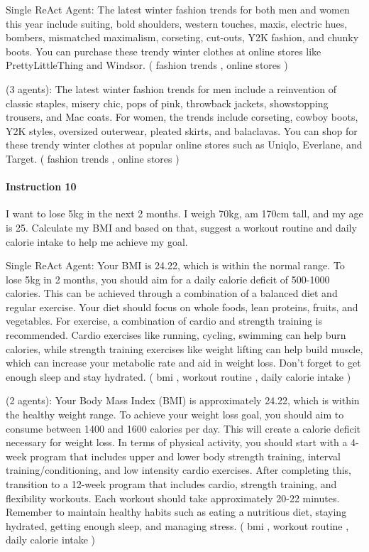 {\color{blue} Single ReAct Agent}: The latest winter fashion trends for both men and women this year include suiting, bold shoulders, western touches, maxis, electric hues, bombers, mismatched maximalism, corseting, cut-outs, Y2K fashion, and chunky boots. You can purchase these trendy winter clothes at online stores like PrettyLittleThing and Windsor. ({\color{teal} fashion trends \cmark}, {\color{teal} online stores \cmark})

{\color{magenta} \framework (3 agents)}: The latest winter fashion trends for men include a reinvention of classic staples, misery chic, pops of pink, throwback jackets, showstopping trousers, and Mac coats. For women, the trends include corseting, cowboy boots, Y2K styles, oversized outerwear, pleated skirts, and balaclavas. You can shop for these trendy winter clothes at popular online stores such as Uniqlo, Everlane, and Target. ({\color{teal} fashion trends \cmark}, {\color{teal} online stores \cmark})

\paragraph{Instruction 10} I want to lose 5kg in the next 2 months. I weigh 70kg, am 170cm tall, and my age is 25. Calculate my BMI and based on that, suggest a workout routine and daily calorie intake to help me achieve my goal.

{\color{blue} Single ReAct Agent}: Your BMI is 24.22, which is within the normal range. To lose 5kg in 2 months, you should aim for a daily calorie deficit of 500-1000 calories. This can be achieved through a combination of a balanced diet and regular exercise. Your diet should focus on whole foods, lean proteins, fruits, and vegetables. For exercise, a combination of cardio and strength training is recommended. Cardio exercises like running, cycling, swimming can help burn calories, while strength training exercises like weight lifting can help build muscle, which can increase your metabolic rate and aid in weight loss. Don't forget to get enough sleep and stay hydrated. ({\color{teal} bmi \cmark}, {\color{teal} workout routine \cmark}, {\color{teal} daily calorie intake \cmark})

{\color{magenta} \framework (2 agents)}: Your Body Mass Index (BMI) is approximately 24.22, which is within the healthy weight range. To achieve your weight loss goal, you should aim to consume between 1400 and 1600 calories per day. This will create a calorie deficit necessary for weight loss. In terms of physical activity, you should start with a 4-week program that includes upper and lower body strength training, interval training/conditioning, and low intensity cardio exercises. After completing this, transition to a 12-week program that includes cardio, strength training, and flexibility workouts. Each workout should take approximately 20-22 minutes. Remember to maintain healthy habits such as eating a nutritious diet, staying hydrated, getting enough sleep, and managing stress. ({\color{teal} bmi \cmark}, {\color{teal} workout routine \cmark}, {\color{teal} daily calorie intake \cmark})

